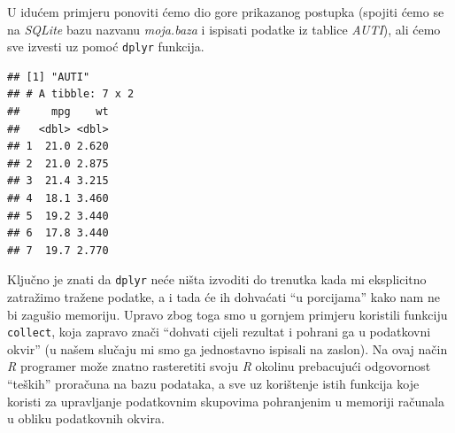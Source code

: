 \documentclass[]{book}
\newenvironment{Shaded}{\begin{snugshade}}{\end{snugshade}}
\newcommand{\KeywordTok}[1]{\textcolor[rgb]{0.13,0.29,0.53}{\textbf{#1}}}
\newcommand{\DataTypeTok}[1]{\textcolor[rgb]{0.13,0.29,0.53}{#1}}
\newcommand{\DecValTok}[1]{\textcolor[rgb]{0.00,0.00,0.81}{#1}}
\newcommand{\StringTok}[1]{\textcolor[rgb]{0.31,0.60,0.02}{#1}}
\newcommand{\CommentTok}[1]{\textcolor[rgb]{0.56,0.35,0.01}{\textit{#1}}}
\newcommand{\OtherTok}[1]{\textcolor[rgb]{0.56,0.35,0.01}{#1}}
\newcommand{\OperatorTok}[1]{\textcolor[rgb]{0.81,0.36,0.00}{\textbf{#1}}}
\newcommand{\NormalTok}[1]{#1}
\theoremstyle{definition}
\theoremstyle{definition}
\theoremstyle{definition}
\theoremstyle{remark}
\begin{document}
U idućem primjeru ponoviti ćemo dio gore prikazanog postupka (spojiti
ćemo se na \emph{SQLite} bazu nazvanu \emph{moja.baza} i ispisati
podatke iz tablice \emph{AUTI}), ali ćemo sve izvesti uz pomoć
\texttt{dplyr} funkcija.

\begin{Shaded}
\end{Shaded}

\begin{verbatim}
## [1] "AUTI"
## # A tibble: 7 x 2
##     mpg    wt
##   <dbl> <dbl>
## 1  21.0 2.620
## 2  21.0 2.875
## 3  21.4 3.215
## 4  18.1 3.460
## 5  19.2 3.440
## 6  17.8 3.440
## 7  19.7 2.770
\end{verbatim}

Ključno je znati da \texttt{dplyr} neće ništa izvoditi do trenutka kada
mi eksplicitno zatražimo tražene podatke, a i tada će ih dohvaćati ``u
porcijama'' kako nam ne bi zagušio memoriju. Upravo zbog toga smo u
gornjem primjeru koristili funkciju \texttt{collect}, koja zapravo znači
``dohvati cijeli rezultat i pohrani ga u podatkovni okvir'' (u našem
slučaju mi smo ga jednostavno ispisali na zaslon). Na ovaj način
\emph{R} programer može znatno rasteretiti svoju \emph{R} okolinu
prebacujući odgovornost ``teških'' proračuna na bazu podataka, a sve uz
korištenje istih funkcija koje koristi za upravljanje podatkovnim
skupovima pohranjenim u memoriji računala u obliku podatkovnih okvira.
\end{document}
